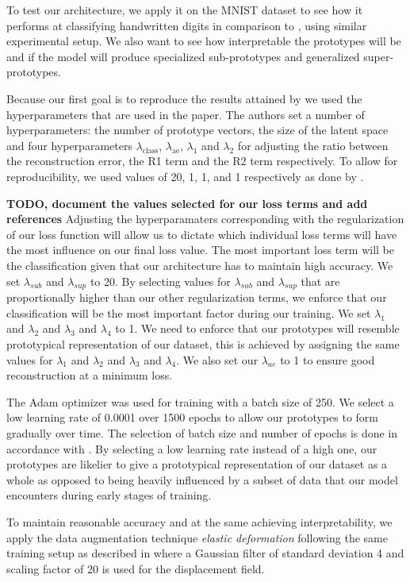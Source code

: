 To test our architecture, we apply it on the MNIST dataset to see how it performs at classifying handwritten digits in comparison to \cite{li2018deep}, using similar experimental setup. We also want to see how interpretable the prototypes will be and if the model will produce specialized sub-prototypes and generalized super-prototypes.

Because our first goal is to reproduce the results attained by  \cite{li2018deep} we used the hyperparameters that are used in the paper. The authors set a number of hyperparameters: the number of prototype vectors, the size of the latent space and four hyperparameters $\lambda_{\text{class}}$, $\lambda_{\text{ae}}$, $\lambda_1$ and $\lambda_2$ for adjusting the ratio between the reconstruction error, the R1 term and the R2 term respectively. To allow for reproducibility, we used values of 20, 1, 1, and 1 respectively as done by \cite{li2018deep}.

\textbf{TODO, document the values selected for our loss terms and add references}
Adjusting the hyperparamaters corresponding with the regularization of our loss function will allow us to dictate which individual loss terms will have the most influence on our final loss value. The most important loss term will be the classification given that our architecture has to maintain high accuracy. We set $\lambda_{sub}$ and $\lambda_{sup}$ to 20. By selecting values for $\lambda_{sub}$ and $\lambda_{sup}$ that are proportionally higher than our other regularization terms, we enforce that our classification will be the most important factor during our training. We set $\lambda_{1}$ and $\lambda_{2}$ and $\lambda_{3}$ and $\lambda_{4}$ to 1. We need to enforce that our prototypes will resemble prototypical representation of our dataset, this is achieved by assigning the same values for $\lambda_{1}$ and $\lambda_{2}$ and $\lambda_{3}$ and $\lambda_{4}$. We also set our $\lambda_{ae}$ to 1 to ensure good reconstruction at a minimum loss. 

The Adam optimizer \cite{adam} was used for training with a batch size of 250. We select a low learning rate of 0.0001 over 1500 epochs to allow our prototypes to form gradually over time. The selection of batch size and number of epochs is done in accordance with \cite{li2018deep}. By selecting a low learning rate instead of a high one, our prototypes are likelier to give a prototypical representation of our dataset as a whole as opposed to being heavily influenced by a subset of data that our model encounters during early stages of training. 


To maintain reasonable accuracy and at the same achieving interpretability, we apply the data augmentation technique \textit{elastic deformation}\citep{elasticdeformation} following the same training setup as described in \citep{li2018deep} where a Gaussian filter of standard deviation 4 and scaling factor of 20 is used for the displacement field. 